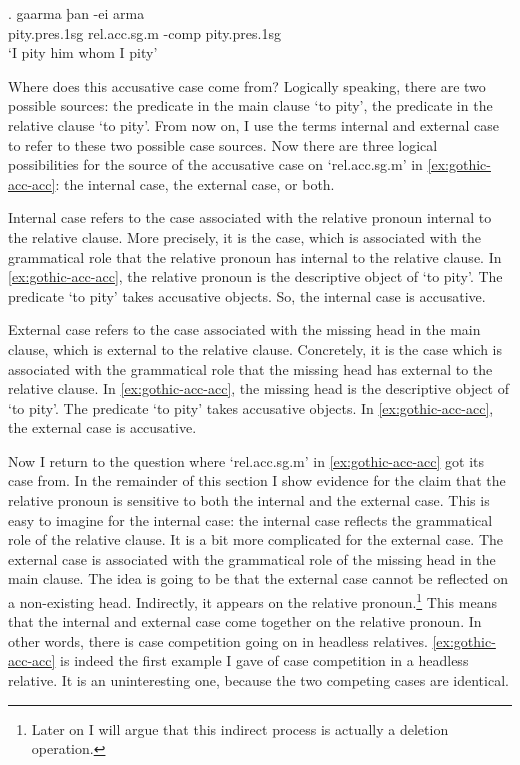 \exg. gaarma þan -ei arma\\
 pity.\ac{pres}.1\ac{sg}\scsub{[acc]} \ac{rel}.\ac{acc}.\ac{sg}.\ac{m} -\ac{comp} pity.\ac{pres}.1\ac{sg}\scsub{[acc]}\\
 `I pity him whom I pity' \label{ex:gothic-acc-acc}

Where does this accusative case come from? Logically speaking, there are two possible sources: the predicate in the main clause  `to pity', the predicate in the relative clause  `to pity'. From now on, I use the terms internal and external case to refer to these two possible case sources. Now there are three logical possibilities for the source of the accusative case on  `\ac{rel}.\ac{acc}.\ac{sg}.\ac{m}' in \ref{ex:gothic-acc-acc}: the internal case, the external case, or both.

Internal case refers to the case associated with the relative pronoun internal to the relative clause. More precisely, it is the case, which is associated with the grammatical role that the relative pronoun has internal to the relative clause. In \ref{ex:gothic-acc-acc}, the relative pronoun is the descriptive object of  `to pity'. The predicate  `to pity' takes accusative objects. So, the internal case is accusative.

External case refers to the case associated with the missing head in the main clause, which is external to the relative clause. Concretely, it is the case which is associated with the grammatical role that the missing head has external to the relative clause. In \ref{ex:gothic-acc-acc}, the missing head is the descriptive object of  `to pity'. The predicate  `to pity' takes accusative objects. In \ref{ex:gothic-acc-acc}, the external case is accusative.

Now I return to the question where  `\ac{rel}.\ac{acc}.\ac{sg}.\ac{m}' in \ref{ex:gothic-acc-acc} got its case from. In the remainder of this section I show evidence for the claim that the relative pronoun is sensitive to both the internal and the external case.
This is easy to imagine for the internal case: the internal case reflects the grammatical role of the relative clause. It is a bit more complicated for the external case. The external case is associated with the grammatical role of the missing head in the main clause. The idea is going to be that the external case cannot be reflected on a non-existing head. Indirectly, it appears on the relative pronoun.\footnote{
Later on I will argue that this indirect process is actually a deletion operation.
}
This means that the internal and external case come together on the relative pronoun. In other words, there is case competition going on in headless relatives. \ref{ex:gothic-acc-acc} is indeed the first example I gave of case competition in a headless relative. It is an uninteresting one, because the two competing cases are identical.

